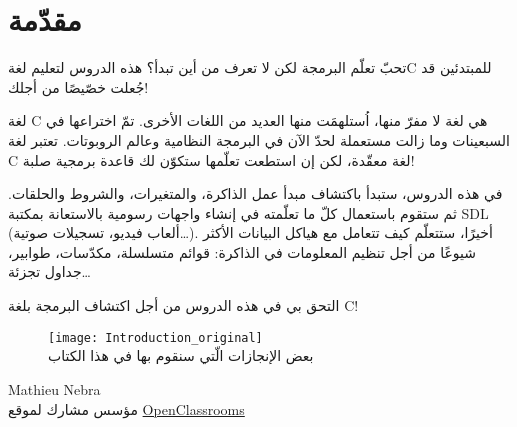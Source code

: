 \chapter*{مقدّمة}

\vspace{-0.6em}
تحبّ تعلّم البرمجة لكن لا تعرف من أين تبدأ؟ هذه الدروس لتعليم لغة\textenglish{C}
للمبتدئين قد جُعلت خصّيصًا من أجلك!

\vspace{-0.1em}
لغة \textenglish{C}
هي لغة لا مفرّ منها، اُستلهمَت منها العديد من اللغات الأخرى. تمّ اختراعها في السبعينات وما زالت مستعملة لحدّ الآن في البرمجة النظامية وعالم الروبوتات. تعتبر لغة \textenglish{C}
لغة معقّدة، لكن إن استطعت تعلّمها ستكوّن لك قاعدة برمجية صلبة!

\vspace{-0.1em}
في هذه الدروس، ستبدأ باكتشاف مبدأ عمل الذاكرة، والمتغيرات، والشروط والحلقات. ثم ستقوم باستعمال كلّ ما تعلّمته في إنشاء واجهات رسومية بالاستعانة بمكتبة
\textenglish{SDL}
 (ألعاب فيديو، تسجيلات صوتية\dots). أخيرًا، ستتعلّم كيف تتعامل مع هياكل البيانات الأكثر شيوعًا من أجل تنظيم المعلومات في الذاكرة: قوائم متسلسلة، مكدّسات، طوابير، جداول تجزئة\dots

\vspace{-0.1em}
التحق بي في هذه الدروس من أجل اكتشاف البرمجة بلغة \textenglish{C}!

\begin{figure}[H]
	\centering
	\texttt{[image: Introduction\_original]}\\
\small بعض الإنجازات الّتي سنقوم بها في هذا الكتاب
\end{figure}

\vfill
\hfill\parbox{0.3\textwidth}{\centering \textenglish{Mathieu Nebra}\\[0.2em]
مؤسس مشارك لموقع
\href{http://openclassrooms.com/}{\textenglish{OpenClassrooms}}
}
